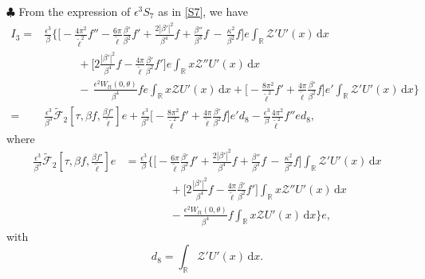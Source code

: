 \documentclass[10pt, reqno]{amsart}
\numberwithin{equation}{section}
\theoremstyle{definition}
\begin{document}
{\smallskip\noindent $\clubsuit$
 From the expression of $\epsilon^3 S_7$ as in \eqref{S7}, we have
\begin{align} \label{intB4-new}
I_3
 = & \frac{\epsilon^3}\beta\Bigg\{
\Big[
-\frac{4\pi^2}{{\tilde\ell}^2}f''
-\frac{6\pi}{\tilde\ell} \frac{\beta'}{\beta^2} f'
+\frac{2|\beta'|^2}{\beta^4}f
+\frac{\beta''} {\beta^3}f
\,-\,\frac{\kappa^2}{\beta^2}f
\Big]e\int_{{\mathbb R}}{\mathcal Z}' U'(x)\,{\mathrm d}x
\nonumber\\[2mm]
&\qquad\quad+ \Big[2\frac{|\beta'|^2}{\beta^4} f
-\frac{4\pi}{ {\tilde\ell}}\frac{\beta'}{\beta^2}f'
\Big]e\int_{{\mathbb R}} x{\mathcal Z}''U'(x)\,{\mathrm d}x
\nonumber\\[2mm]
&\qquad\quad -\, \frac{\epsilon^2W_{tt}(0, \theta)}{\beta^4}f e \int_{{\mathbb R}}x{\mathcal Z}U'(x)\,{\mathrm d}x
+
\Big[ -\frac{8\pi^2}{{\tilde\ell}^2}f' +\frac{4\pi}{ {\tilde\ell}}\frac{\beta'}{\beta^2} f\Big]e' \int_{{\mathbb R}}{\mathcal Z}' U'(x)\,{\mathrm d}x
\Bigg\}
\nonumber\\[2mm]
 = &\frac{\epsilon^3}{\beta^3}\tilde{\mathcal F}_2\left[\tau, \beta f, \frac{\beta f'}{\tilde\ell} \right] e
 +\frac{\epsilon^3}{\beta^3}\Big[ -\frac{8\pi^2}{{\tilde\ell}^2}f' +\frac{4\pi}{ {\tilde\ell}}\frac{\beta'}{\beta^2} f\Big]e'd_8 - \frac{\epsilon^3}\beta\frac{4\pi^2}{{\tilde\ell}^2}f'' e d_8,
\end{align}
where
\begin{align*}
\frac{\epsilon^3}{\beta^3}\tilde{\mathcal F}_2\left[\tau, \beta f, \frac{\beta f'}{\tilde\ell} \right] e &=\frac{\epsilon^3}{\beta} \Bigg\{\Big[
-\frac{6\pi}{\tilde\ell} \frac{\beta'}{\beta^2} f'
+\frac{2|\beta'|^2}{\beta^4}f
+\frac{\beta''} {\beta^3}f
\,-\,\frac{\kappa^2}{\beta^2}f
\Big] \int_{{\mathbb R}}{\mathcal Z}' U'(x)\,{\mathrm d}x
\nonumber\\[2mm]
& \qquad \qquad
+\Big[2\frac{|\beta'|^2}{\beta^4} f
-\frac{4\pi}{ {\tilde\ell}}\frac{\beta'}{\beta^2}f'
\Big]\int_{{\mathbb R}} x{\mathcal Z}''U'(x)\,{\mathrm d}x
\nonumber\\[2mm]
& \qquad \qquad- \frac{\epsilon^2W_{tt}(0, \theta)}{\beta^4}f \int_{{\mathbb R}}x{\mathcal Z}U'(x)\,{\mathrm d}x \Bigg\}e,
\end{align*}
 with $$d_8 = \int_{{\mathbb R}}{\mathcal Z}' U'(x)\,{\mathrm d}x. $$


}
\end{document}
